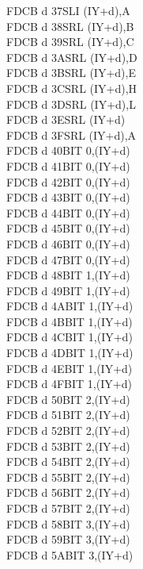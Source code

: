 \begin{multicols}{3}
{\begin{tabbing}
	FDCB d 37\>SLI (IY+d),A\UNDOC\\
	FDCB d 38\>SRL (IY+d),B\UNDOC\\
	FDCB d 39\>SRL (IY+d),C\UNDOC\\
	FDCB d 3A\>SRL (IY+d),D\UNDOC\\
	FDCB d 3B\>SRL (IY+d),E\UNDOC\\
	FDCB d 3C\>SRL (IY+d),H\UNDOC\\
	FDCB d 3D\>SRL (IY+d),L\UNDOC\\
	FDCB d 3E\>SRL (IY+d)\\
	FDCB d 3F\>SRL (IY+d),A\UNDOC\\
	FDCB d 40\>BIT 0,(IY+d)\UNDOC\\
	FDCB d 41\>BIT 0,(IY+d)\UNDOC\\
	FDCB d 42\>BIT 0,(IY+d)\UNDOC\\
	FDCB d 43\>BIT 0,(IY+d)\UNDOC\\
	FDCB d 44\>BIT 0,(IY+d)\UNDOC\\
	FDCB d 45\>BIT 0,(IY+d)\UNDOC\\
	FDCB d 46\>BIT 0,(IY+d)\\
	FDCB d 47\>BIT 0,(IY+d)\UNDOC\\
	FDCB d 48\>BIT 1,(IY+d)\UNDOC\\
	FDCB d 49\>BIT 1,(IY+d)\UNDOC\\
	FDCB d 4A\>BIT 1,(IY+d)\UNDOC\\
	FDCB d 4B\>BIT 1,(IY+d)\UNDOC\\
	FDCB d 4C\>BIT 1,(IY+d)\UNDOC\\
	FDCB d 4D\>BIT 1,(IY+d)\UNDOC\\
	FDCB d 4E\>BIT 1,(IY+d)\\
	FDCB d 4F\>BIT 1,(IY+d)\UNDOC\\
	FDCB d 50\>BIT 2,(IY+d)\UNDOC\\
	FDCB d 51\>BIT 2,(IY+d)\UNDOC\\
	FDCB d 52\>BIT 2,(IY+d)\UNDOC\\
	FDCB d 53\>BIT 2,(IY+d)\UNDOC\\
	FDCB d 54\>BIT 2,(IY+d)\UNDOC\\
	FDCB d 55\>BIT 2,(IY+d)\UNDOC\\
	FDCB d 56\>BIT 2,(IY+d)\\
	FDCB d 57\>BIT 2,(IY+d)\UNDOC\\
	FDCB d 58\>BIT 3,(IY+d)\UNDOC\\
	FDCB d 59\>BIT 3,(IY+d)\UNDOC\\
	FDCB d 5A\>BIT 3,(IY+d)\UNDOC\\

\end{tabbing}}
\end{multicols}
